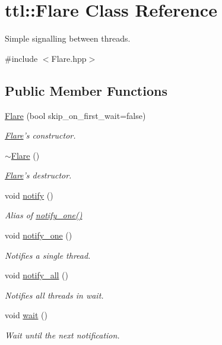 \hypertarget{classttl_1_1_flare}{\section{ttl\-:\-:Flare Class Reference}
\label{classttl_1_1_flare}
}


Simple signalling between threads.  




{\ttfamily \#include $<$Flare.\-hpp$>$}

\subsection*{Public Member Functions}
\begin{DoxyCompactItemize}
\item 
\hyperlink{classttl_1_1_flare_a1da87d88f8f5faa5e5ee952227db8874}{Flare} (bool skip\-\_\-on\-\_\-first\-\_\-wait=false)
\begin{DoxyCompactList}\small\item\em \hyperlink{classttl_1_1_flare}{Flare}'s constructor. \end{DoxyCompactList}\item 
\hyperlink{classttl_1_1_flare_a9ea08920c3bd56842717c5cf17a1d42b}{$\sim$\-Flare} ()
\begin{DoxyCompactList}\small\item\em \hyperlink{classttl_1_1_flare}{Flare}'s destructor. \end{DoxyCompactList}\item 
void \hyperlink{classttl_1_1_flare_ae58ef0d0d3e2c39030d90bdf0ee9af86}{notify} ()
\begin{DoxyCompactList}\small\item\em Alias of \hyperlink{classttl_1_1_flare_a6a643e4c8f80e6f34bb37bf4768dd5fe}{notify\-\_\-one()} \end{DoxyCompactList}\item 
void \hyperlink{classttl_1_1_flare_a6a643e4c8f80e6f34bb37bf4768dd5fe}{notify\-\_\-one} ()
\begin{DoxyCompactList}\small\item\em Notifies a single thread. \end{DoxyCompactList}\item 
void \hyperlink{classttl_1_1_flare_a4d3ffbd8573c2981419c5577b9c4297d}{notify\-\_\-all} ()
\begin{DoxyCompactList}\small\item\em Notifies all threads in wait. \end{DoxyCompactList}\item 
void \hyperlink{classttl_1_1_flare_ae42081d40158673f7c7615ada9047eb3}{wait} ()
\begin{DoxyCompactList}\small\item\em Wait until the next notification. \end{DoxyCompactList}\end{DoxyCompactItemize}



